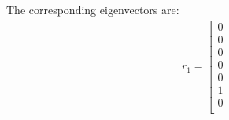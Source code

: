 The corresponding eigenvectors are:
\begin{equation}
\label{eq:UCS-eigenvectors}
\begin{array}{l}
{r_1} = \left[ {\begin{array}{*{20}{c}}
0\\
0\\
0\\
0\\
0\\
1\\
0\\

\end{array}}
\end{array}
\end{equation}
